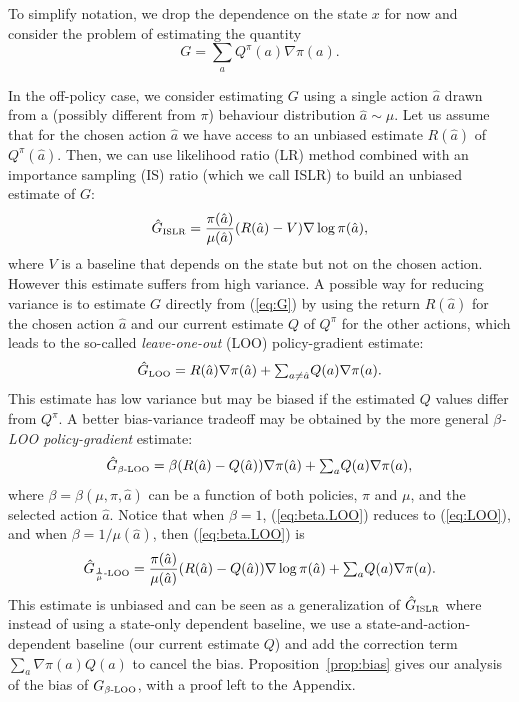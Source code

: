 \documentclass{article}
\newcommand{\beq}{\begin{equation}}
\newcommand{\eeq}{\end{equation}}
\newcommand{\action}{{\hat a}}
\begin{document}
To simplify notation, we drop the dependence on the state $x$ for now and 
consider the problem of estimating the quantity
\beq\label{eq:G}
G = {\textstyle \sum_a } Q^{\pi}(a) \nabla \pi(a).
\eeq

In the off-policy case, we consider estimating $G$ using a single action $\action$ 
drawn from a (possibly different from $\pi$) behaviour distribution 
$\action\sim\mu$. Let us assume that for the chosen action $\action$ we have access to an 
unbiased estimate $R(\action)$ of $Q^{\pi}(\action)$. Then, we can use likelihood ratio (LR) 
method combined with an importance sampling (IS) ratio (which we call ISLR) to 
build an unbiased estimate of $G$:
$$ \hat G_{\mbox{\tiny ISLR}} = \frac{\pi(\action)}{\mu(\action)}(R(\action) - V) 
\nabla\log\pi(\action) ,$$
where $V$ is a baseline that depends on the state but not on the chosen action. 
However this estimate suffers from high variance. A possible way for reducing 
variance is to estimate $G$ directly from (\ref{eq:G}) by using the return 
$R(\action)$ for the chosen action $\action$ and our current estimate $Q$ of $Q^{\pi}$ for 
the other actions, which leads to the so-called {\em leave-one-out} (LOO) 
policy-gradient estimate:
\beq\label{eq:LOO}
\hat G_{\mbox{\tiny LOO}} = R(\action) \nabla \pi(\action) + {\textstyle \sum_{a\neq \action} } 
Q(a) \nabla 
\pi(a) .
\eeq
This estimate has low variance but may be biased if the estimated $Q$ values 
differ from $Q^{\pi}$. A better bias-variance tradeoff may be obtained by 
the more general {\em $\beta$-LOO policy-gradient} estimate:
\beq\label{eq:beta.LOO}
\hat G_{\mbox{\tiny $\beta$-LOO}} = \beta (R(\action) - Q(\action)) \nabla \pi(\action) + 
{\textstyle \sum_{a} }
 Q(a) \nabla \pi(a),
\eeq
where $\beta =  \beta(\mu,\pi,\action)$ can be a function of both policies, $\pi$ and 
$\mu$, and the selected action $\action$. Notice that when $\beta=1$, 
(\ref{eq:beta.LOO}) reduces to (\ref{eq:LOO}), and when $\beta=1/\mu(\action)$, then 
(\ref{eq:beta.LOO}) is
\beq \label{eq:1/mu.loo}
\hat G_{\mbox{\tiny $\frac{1}{\mu}$-LOO}} = 
\frac{\pi(\action)}{\mu(\action)} (R(\action) - Q(\action)) \nabla\log\pi(\action) + {\textstyle \sum_a } 
Q(a) 
\nabla\pi(a).
\eeq
This estimate is unbiased and can be seen as a generalization of $\hat 
G_{\mbox{\tiny ISLR}}$ where instead of using a state-only dependent baseline, 
we use a state-and-action-dependent baseline (our current estimate $Q$) and add 
the correction term $\sum_a\nabla\pi(a)Q(a)$ to cancel the bias. 
Proposition~\ref{prop:bias} gives our analysis of the bias of $G_{\mbox{\tiny 
$\beta$-LOO}}$, with a proof left to the Appendix.
\end{document}
